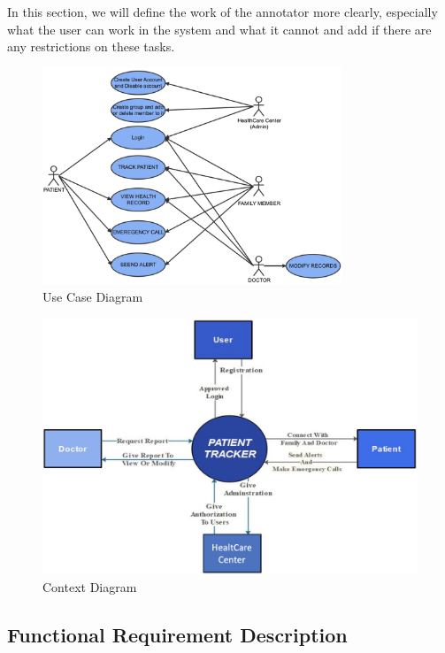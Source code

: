 \documentclass[12pt]{article}
\begin{document}
			\quad In this section, we will define the work of the annotator more clearly, especially what the user can work in the system and what it cannot and add if there are any restrictions on these tasks.
			\begin{figure}[!h]
				\centering
				\includegraphics[width=0.8\textwidth]{use-diagram.png}
				\caption{Use Case Diagram}
				\label{Use Diagram}
			\end{figure}
			\begin{figure}[!h]
				\centering
				\includegraphics[width=\textwidth]{context-diagram.png}
				\caption{Context Diagram}
				\label{Context Diagram}
			\end{figure}
		\newpage
		\begin{center}
			\newpage
		\end{center}
	   
		\subsection{Functional Requirement Description}
		
\end{document}
